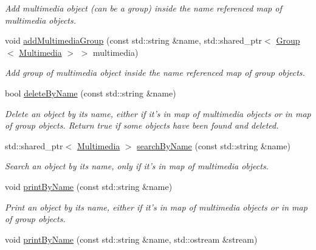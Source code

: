 \begin{DoxyCompactItemize}
\begin{DoxyCompactList}\small\item\em Add multimedia object (can be a group) inside the name referenced map of multimedia objects. \end{DoxyCompactList}\item 
\hypertarget{class_factory_a21b79ba789374d4ab5c44dcfb4c1542f}{void \hyperlink{class_factory_a21b79ba789374d4ab5c44dcfb4c1542f}{add\-Multimedia\-Group} (const std\-::string \&name, std\-::shared\-\_\-ptr$<$ \hyperlink{class_group}{Group}$<$ \hyperlink{class_multimedia}{Multimedia} $>$ $>$ multimedia)}\label{class_factory_a21b79ba789374d4ab5c44dcfb4c1542f}

\begin{DoxyCompactList}\small\item\em Add group of multimedia object inside the name referenced map of group objects. \end{DoxyCompactList}\item 
\hypertarget{class_factory_ad0553a33a3e6bd24614b0d645f7906e4}{bool \hyperlink{class_factory_ad0553a33a3e6bd24614b0d645f7906e4}{delete\-By\-Name} (const std\-::string \&name)}\label{class_factory_ad0553a33a3e6bd24614b0d645f7906e4}

\begin{DoxyCompactList}\small\item\em Delete an object by its name, either if it's in map of multimedia objects or in map of group objects. Return true if some objects have been found and deleted. \end{DoxyCompactList}\item 
\hypertarget{class_factory_a1e9f22828141fcb6e4f06ba8d93325f7}{std\-::shared\-\_\-ptr$<$ \hyperlink{class_multimedia}{Multimedia} $>$ \hyperlink{class_factory_a1e9f22828141fcb6e4f06ba8d93325f7}{search\-By\-Name} (const std\-::string \&name)}\label{class_factory_a1e9f22828141fcb6e4f06ba8d93325f7}

\begin{DoxyCompactList}\small\item\em Search an object by its name, only if it's in map of multimedia objects. \end{DoxyCompactList}\item 
\hypertarget{class_factory_a4c9ab55f5a833bfcb687405181936df7}{void \hyperlink{class_factory_a4c9ab55f5a833bfcb687405181936df7}{print\-By\-Name} (const std\-::string \&name)}\label{class_factory_a4c9ab55f5a833bfcb687405181936df7}

\begin{DoxyCompactList}\small\item\em Print an object by its name, either if it's in map of multimedia objects or in map of group objects. \end{DoxyCompactList}\item 
\hypertarget{class_factory_a3be1c89ec4c2b21f3fc9b0913228ee01}{void \hyperlink{class_factory_a3be1c89ec4c2b21f3fc9b0913228ee01}{print\-By\-Name} (const std\-::string \&name, std\-::ostream \&stream)}\label{class_factory_a3be1c89ec4c2b21f3fc9b0913228ee01}


\end{DoxyCompactItemize}
